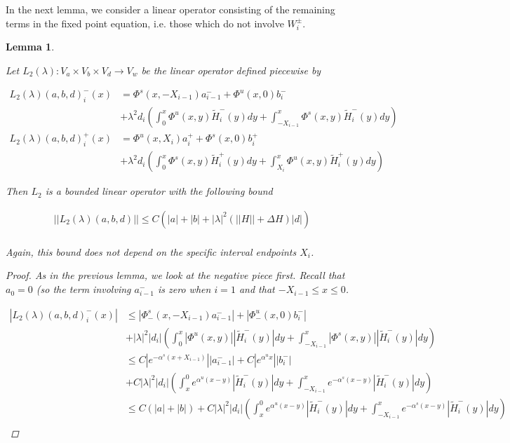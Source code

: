 \documentclass[12pt]{article}
\newtheorem{lemma}{Lemma}
\begin{document}
In the next lemma, we consider a linear operator consisting of the remaining terms in the fixed point equation, i.e. those which do not involve $W_i^\pm$.

\begin{lemma}\label{L2}

Let $L_2(\lambda): V_a \times V_b \times V_d \rightarrow V_w$ be the linear operator defined piecewise by

\begin{align*}
L_2(\lambda)(a, b, d)_i^-(x) &= \Phi^s(x, -X_{i-1})a^-_{i-1} + \Phi^u(x, 0)b_i^- \\
&+ \lambda^2 d_i \left( \int_0^x \Phi^u(x, y)\tilde{H}_i^-(y) dy  + \int_{-X_{i-1}}^x \Phi^s(x, y)\tilde{H}_i^-(y) dy \right)\\
L_2(\lambda)(a, b, d)_i^+(x) &= \Phi^u(x, X_i)a^+_{i} + \Phi^s(x, 0)b_i^+ \\
&+ \lambda^2 d_i \left( \int_0^x \Phi^s(x, y)\tilde{H}_i^+(y) dy + \int_{X_{i}}^x \Phi^u(x, y)\tilde{H}_i^+(y) dy \right)
\end{align*}

Then $L_2$ is a bounded linear operator with the following bound

\begin{align*}
||L_2(\lambda)(a, b, d)|| \leq C(|a| + |b| + |\lambda|^2 ( ||H|| + \Delta H ) |d|)  \\
\end{align*}

Again, this bound does not depend on the specific interval endpoints $X_i$.

\begin{proof}

As in the previous lemma, we look at the negative piece first. Recall that $a_0 = 0$ (so the term involving $a^-_{i-1}$ is zero when $i = 1$ and that $-X_{i-1} \leq x \leq 0$. 

\begin{align*}
| L_2(\lambda)(a, b, d)_i^-(x)| &\leq |\Phi^s_-(x, -X_{i-1})a^-_{i-1}| + |\Phi^u_-(x, 0)b_i^-| \\
&+ |\lambda|^2 |d_i| \left( \int_0^x |\Phi^u(x, y)||\tilde{H}_i^-(y)| dy  + \int_{-X_{i-1}}^x |\Phi^s(x, y)||\tilde{H}_i^-(y)| dy \right) \\
&\leq C |e^{-\alpha^s (x + X_{i-1})}||a^-_{i-1}| + C |e^{\alpha^u x}||b_i^-| \\
&+ C|\lambda|^2 |d_i| \left( \int_x^0 e^{\alpha^u (x - y)}|\tilde{H}_i^-(y)| dy + \int_{-X_{i-1}}^x e^{-\alpha^s (x - y)}|\tilde{H}_i^-(y)| dy\right) \\
&\leq C(|a| + |b|) + C|\lambda|^2 |d_i| \left( \int_x^0 e^{\alpha^u (x - y)}|\tilde{H}_i^-(y)| dy + \int_{-X_{i-1}}^x e^{-\alpha^s (x - y)}|\tilde{H}_i^-(y)| dy\right) \\
\end{align*}


\end{proof}
\end{lemma}
\end{document}
